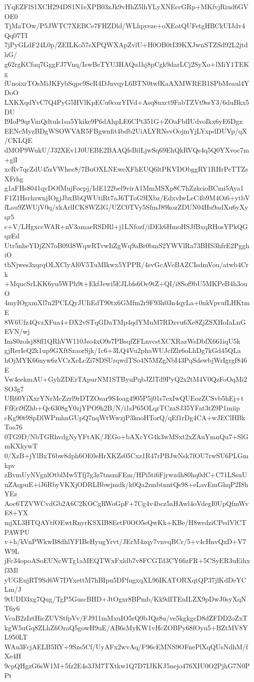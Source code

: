 lYqEZFlS1XCH294DS1N1eXPB03zJk9vHhZ5lhYLyXNEccGRp+MKfvjRiud6GVOE0
TjMaTOw/P5JWTC7XEBCe7FHZDld/WLhpyeze+oXEotQUFetgHBCkUIJdv4Qq07TI
7jPyGLdF24L0p/ZEILKo57sXPQWXApZvlU+H0OB0tI39KXJwnSTZSd92L2jtdhG/
g62rgKCfaq7GggFJ7Vnq/IswBeTYU3HAQu1hj8pCgk9darLCj2SyXo+lMiY1TEKg
fUnoixrTOsMiJKFybSqpc9ScR4DJnvqyL6BTN0twfKaAXMWREB1SPbMeaul4YDoO
LXKXqdYvC7Q4PyG5HVlKpECu0cozYIVd+Asq8uxct9FabTZVt9ssY3/6duBkx5DU
I9IoP9qrVmQdtuls1sa5Ykike9P6dAhpLE6CPt351G+ZOaFbfIUdvoIkx6yE6Dgx
EENcMyzBDgWSOWVAR5FBgwnfit4bdb2UiALYRNsvOojmYjLYxpdDUVp/qX/CKLQE
dMOP9WukU/J32XEv1J0UEBE2BAAQfsBilLjwSq69EhQkRVQs4q5Q0YXvoc7m+glI
xcRv7qcZdU45zVWhec8/7BuOXLNEweXFhEUQ6ltPKVDObggRY1RHrPeTTZsXFrhg
g1aFHs8041qyDOfMujFocpj/IdE122bel9virA1MmMSXp8C7hZzkcioBCmi5Aya1
F1Z1HsrhzwnjIOgjJbxBbQWUtiRt7aJ6TToG9IXbz/EdxvIwLeC4b9M4Oi6+ytbV
fLau9ZWUjV0q/xkArlICK8WZ3G/UZC0TVy5SfmJ89kozZDUN04Hu9adXu6yXyqr5
c+V/LHgxccWAR+nV3amaeRSDRl+j1LNfozf/iDEk6HmoHSJfBxqRHosYPkQGqzEd
Utr5nheYDjZN7oB0938WqwRTvwIiZgWq9aBr0bmS2YWVlRa73BHS3hfrE2PgghiO
tbNjwes3xqrqOLXClyAl0V5TuMIkwx5YPPR/4svGcAVeBAZCIsdmVou/atwb4Crk
+MqucSrLKK6yu5WPh9t+EkfJewi5EJLbfs6Oe9tZ+QI/i8Sof9bU5MKPeB4h3ouO
4myIOgxmXl7n2PCLQyJUIiEdT90tx6GMfm2r9F93h03n4qyLa+0nkVpvufLHKtmE
8W6Ufz4QvzXFua4+DX2vSTqGDaTMp4qdYMuM7RDzvu6Xe8ZjZSXHoIaLnGEVN/wj
ImS0zolsj88ff1QRhVW110Jso4xO9s7PBsqfZFLnvcstXCXRazWsDbfX661iqU5k
gjRerIeQ2k1up9GXftSzaorSjk/1c6+3LQ4Vu2phaWUJcfZlr6oLhDg7kGd45QLa
hOjMYK66nyw6zVCzXeLcZi78DSUrqwdTSo4N5MZgNbI43PqSdswbjWrIgrgf846E
Vw4eekmAU+GyhZDErTApurNM1STByuPqbJZlTd9PyQ2x2tM4V0QzFoOqMi2SO3g7
UR60YiXxrYNrMcZzrl9rDTZOsar9S4oag4905P5j01s7exIwQUEozZCSvb5hEj+t
FfEri9fZhb+Qc6308gY0zjYPO9h2B/N/i1sP65OLqrTCzaSJ35YFat3tZ9P1miip
cKg90t9SpDlWPmhnGUpQ7nqWtWwzjP3kooHTorQ/qEf1rDg4CA+wJEClHBkToa76
0TG9D/NbTGRhvdgNyYFtAK/JEGo+bAXcYG4k3wMSxt2xZAuYmnQu7+SlGmKXkywT
0/XzB+jYlBxT6bw8dph6OE0eHrXKZs05Cxz1R47rPBJwNsk7fOU7rwSU6PLGmkpv
zBvmUyNVgnlOtblMw5Tfj7g3z7tnsmFEm/HPi5ti6Fjrwzdh80hq0dC+C71LSsuU
uZAqpuE+iJ6RbyVKXjODRLBbwjmdk/k0Qa2zmbtnntQs98+eLavEmGhqP2I8hYEz
Aoc6TZVWCvdGb2A6C2KOCgRWoGpF+7Cg4v4bcz5aHAwl4oVdegI0UpQfmWvE8+YX
mjXL3HTQAYtfOEwtRnyrKSXIB8EetF0OO5eQwKk+KBe/H8wrdziCPedVlCTPAWPU
v+h/kVnPWkwB8dhlYFIBeHyugYrvt/JErM4zqy7vnvqBCr/5+v4cHnvQxD+V7W9L
jFc34opoASoEUNcWTg1aMEQTWxFxldb7v8FCGTd3CY66zFR+5CSyER3uEihxf3Ml
yUGEujRT9Sd6W7DYxettM7hBIpu5DPfugxqXL96IKATORXqtQP37jlKdDeYCLm/J
9tUDD3xg7Qug/TgP5GuscBHD+JtOgxr8BPmb/Kk9dITEnILZX9pDwJ0syXqNT6y6
VcaB2zIztHicZUVStfpVv/FJ911mMxuIO5rQ9bJQz8u/ve5kgkgcD8dZFDD2oZxT
kgW5uGq8ZLhZ6OraQ5gowH9uE/AB6sMyKW1vHcZOBPy68fOyu5+BZtMV8YL950LT
WAu3FcjAELB5RY+9Szs5Cf/UyAFx2wvAq/F96cEMNS9OFnePlXqQUsNdhM/fXe4H
9cpQHgzG6sW1M+5fz2E4s3JM7TXtkw1Q7D7IJKKJ5nejo476XIU0O2PjhG7N0PPt
